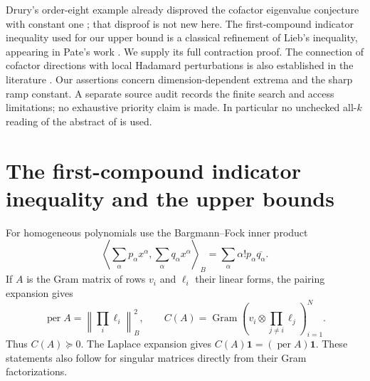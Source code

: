 \documentclass[11pt]{article}
\DeclareMathOperator{\per}{per}
\newcommand{\one}{\mathbf 1}
\begin{document}
Drury's order-eight example already disproved the cofactor eigenvalue
conjecture with constant one \cite{drury}; that disproof is not new here.
The first-compound indicator inequality used for our upper bound is a classical
refinement of Lieb's inequality, appearing in Pate's work \cite{pate96}.
We supply its full contraction proof. The connection of cofactor directions
with local Hadamard perturbations is also established in the literature
\cite{pioge}. Our assertions concern dimension-dependent extrema and the
sharp ramp constant. A separate source audit records the finite search and
access limitations; no exhaustive priority claim is made. In particular no
unchecked all-$k$ reading of the abstract of \cite{pate08} is used.

\section{The first-compound indicator inequality and the upper bounds}
For homogeneous polynomials use the Bargmann--Fock inner product
\[
 \left\langle\sum_\alpha p_\alpha x^\alpha,
 \sum_\alpha q_\alpha x^\alpha\right\rangle_B
 =\sum_\alpha\alpha!p_\alpha\overline{q_\alpha}.
\]
If $A$ is the Gram matrix of rows $v_i$ and $\ell_i$ their linear forms, the
pairing expansion gives
\begin{equation}\label{eq:fock}
 \per A=\left\|\prod_i\ell_i\right\|_B^2,
 \qquad C(A)=\operatorname{Gram}
 \left(v_i\otimes\prod_{j\ne i}\ell_j\right)_{i=1}^N.
\end{equation}
Thus $C(A)\succeq0$. The Laplace expansion gives $C(A)\one=(\per A)\one$.
These statements also follow for singular matrices directly from their Gram
factorizations.
\end{document}

